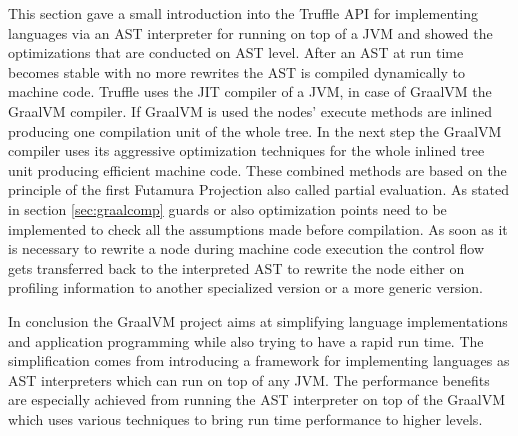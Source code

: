 This section gave a small introduction into the Truffle API for implementing languages via an AST interpreter for running on top of a JVM and showed the optimizations that are conducted on AST level. After an AST at run time becomes stable with no more rewrites the AST is compiled dynamically to machine code. Truffle uses the JIT compiler of a JVM, in case of GraalVM the GraalVM compiler. If GraalVM is used the nodes' execute methods are inlined producing one compilation unit of the whole tree. In the next step the GraalVM compiler uses its aggressive optimization techniques for the whole inlined tree unit producing efficient machine code. These combined methods are based on the principle of the first Futamura Projection also called partial evaluation. \cite{FutaPart} As stated in section \ref{sec:graalcomp} guards or also optimization points need to be implemented to check all the assumptions made before compilation. As soon as it is necessary to rewrite a node during machine code execution the control flow gets transferred back to the interpreted AST to rewrite the node either on profiling information to another specialized version or a more generic version. \cite{ChambDeopt}

In conclusion the GraalVM project aims at simplifying language implementations and application programming while also trying to have a rapid run time. The simplification comes from introducing a framework for implementing languages as AST interpreters which can run on top of any JVM. The performance benefits are especially achieved from running the AST interpreter on top of the GraalVM which uses various techniques to bring run time performance to higher levels.
